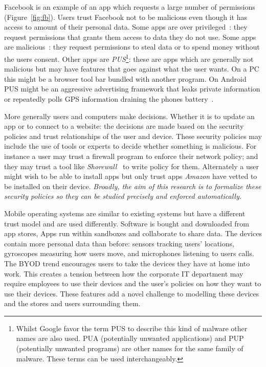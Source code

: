 \documentclass[a4paper]{article}
\begin{document}
Facebook is an example of an app which requests a large number of permissions
(Figure~\ref{fig:fb}). Users trust Facebook not to be malicious even though it
has access to amount of their personal data.  Some apps are over
privileged~\cite{Felt:2011kj}: they request permissions that grants them access
to data they do not use. Some apps are malicious~\cite{Zhou:2012cf}: they
request permissions to steal data or to spend money without the users consent.
Other apps are \emph{\ac{PUS}}\footnote{Whilst Google favor the term \ac{PUS} to
describe this kind of malware other names are also used. PUA (potentially
unwanted applications) and PUP (potentially unwanted programs) are other names
for the same family of malware.  These terms can be used interchangeably.}:
these are apps which are generally not malicious but may have features that goes
against what the user wants.  On a PC this might be a browser tool bar bundled
with another program.  On Android \ac{PUS} might be an aggressive advertising
framework that leaks private information or repeatedly polls GPS information
draining the phones battery~\cite{Svajcer:2013tp}.

More generally users and computers make decisions. Whether it is to update an
app or to connect to a website: the decisions are made based on the security
policies and trust relationships of the user and device.  These security
policies may include the use of tools or experts to decide whether something is
malicious.  For instance a user may trust a firewall program to enforce their
network policy; and they may trust a tool like
\emph{Shorewall}~\cite{Shorewall:uh,Tongaonkar:2007ua} to write
policy for them.  Alternately a user might wish to be able to install apps but
only trust apps \emph{Amazon} have vetted to be installed on their device.
\emph{Broadly, the aim of this research is to formalize these security policies
so they can be studied precisely and enforced automatically.}

Mobile operating systems are similar to existing systems but have a
different trust model and are used differently.  Software is
bought and downloaded from app stores, Apps run within sandboxes and collaborate
to share data. The devices contain more personal data
than before: sensors tracking users' locations,  gyroscopes measuring how
users move, and microphones listening to users calls.  The \ac{BYOD} trend
encourages users to take the devices they have at home into work.
This creates a tension between how the corporate IT department may require
employees to use their devices and the user's policies on how they want to use
their devices.  These features add a novel challenge to modelling these devices
and the stores and users surrounding them.  
\end{document}
